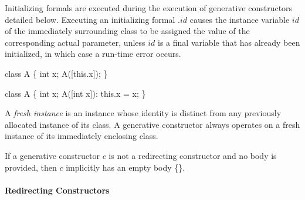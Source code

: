 \documentclass{article}
\newcommand{\code}[1]{{\sf #1}}
\begin{document}

\LMHash{}
Initializing formals are executed during the execution of generative constructors detailed below.
Executing an initializing formal \code{\THIS{}.$id$} causes the instance variable $id$ of the immediately surrounding class to be assigned the value of the corresponding actual parameter,
unless $id$ is a final variable that has already been initialized, in which case a run-time error occurs.


\begin{dartCode}
class A \{
  int x;
  A([this.x]);
\}
\end{dartCode}


\begin{dartCode}
class A \{
  int x;
  A([int x]): this.x = x;
\}
\end{dartCode}

\LMHash{}
A {\em fresh instance} is an instance whose identity  is distinct from any previously allocated instance of its class. A generative constructor always operates on a fresh instance of its immediately enclosing class.


\LMHash{}
If a generative constructor $c$  is not a redirecting constructor and no body is provided, then $c$ implicitly has an empty body \code{\{\}}.


\paragraph{Redirecting Constructors}
\end{document}
